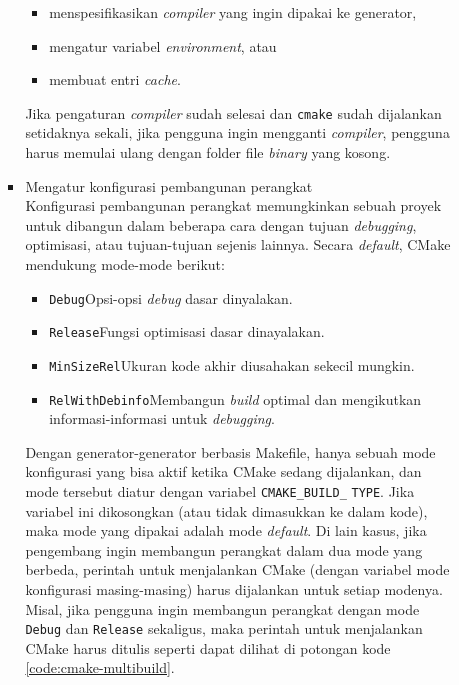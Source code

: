 \documentclass[a4paper,twoside]{article}
\begin{document}
\begin{enumerate}
\begin{enumerate}
\begin{itemize}
		\begin{itemize}
			\item menspesifikasikan \textit{compiler} yang ingin dipakai ke generator,
			\item mengatur variabel \textit{environment}, atau
			\item membuat entri \textit{cache}.
		\end{itemize}
		
		Jika pengaturan \textit{compiler} sudah selesai dan \verb|cmake| sudah dijalankan setidaknya sekali, jika pengguna ingin mengganti \textit{compiler}, pengguna harus memulai ulang dengan folder file \textit{binary} yang kosong.
		\item Mengatur konfigurasi pembangunan perangkat\\
		Konfigurasi pembangunan perangkat memungkinkan sebuah proyek untuk dibangun dalam beberapa cara dengan tujuan \textit{debugging}, optimisasi, atau tujuan-tujuan sejenis lainnya. \linebreak Secara \textit{default}, CMake mendukung mode-mode berikut:
		
		\begin{itemize}
			\item \verb|Debug|\textemdash Opsi-opsi \textit{debug} dasar dinyalakan.
			\item \verb|Release|\textemdash Fungsi optimisasi dasar dinayalakan.
			\item \verb|MinSizeRel|\textemdash Ukuran kode akhir diusahakan sekecil mungkin.
			\item \verb|RelWithDebinfo|\textemdash Membangun \textit{build} optimal dan mengikutkan informasi-informasi \linebreak untuk \textit{debugging}.
		\end{itemize}
		
		Dengan generator-generator berbasis Makefile, hanya sebuah mode konfigurasi yang bisa aktif ketika CMake sedang dijalankan, dan mode tersebut diatur dengan variabel \verb|CMAKE_BUILD_| \linebreak \verb|TYPE|. Jika variabel ini dikosongkan (atau tidak dimasukkan ke dalam kode), maka mode yang dipakai adalah mode \textit{default}. Di lain kasus, jika pengembang ingin membangun perangkat dalam dua mode yang berbeda, perintah untuk menjalankan CMake (dengan variabel mode konfigurasi masing-masing) harus dijalankan untuk setiap modenya. 
		Misal, jika pengguna ingin membangun perangkat dengan mode \verb|Debug| dan \verb|Release| sekaligus, maka perintah untuk menjalankan CMake harus ditulis seperti dapat dilihat di potongan kode \ref{code:cmake-multibuild}.
		

\end{itemize}
\end{enumerate}
\end{enumerate}
\end{document}
